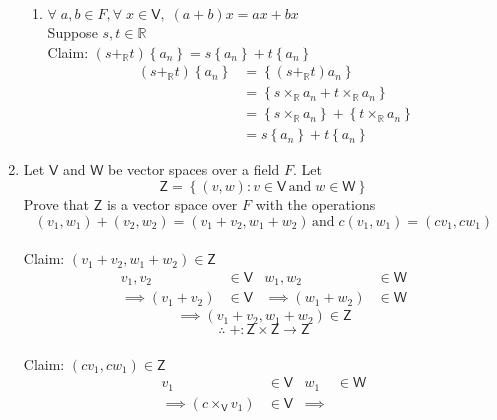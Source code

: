 \documentclass[letterpaper,12pt]{article}
\newcommand{\?}{\stackrel{?}{=}}
\begin{document}
\begin{spacing}{1.5}
\begin{enumerate}
\begin{enumerate}[(VS 1)]
\item$\forall\; a,b \in F, \forall\; x \in \mathsf{V}, \;
  \left(a+b\right)x = ax + bx$
\\
Suppose $s,t \in \mathbb{R}$ 
\\
Claim: $\left(s +_\mathbb{R} t\right)\left\{a_n\right\} =
s\left\{a_n\right\} + t\left\{a_n\right\}$
\begin{align}
\left(s+_\mathbb{R}t\right)\left\{a_n\right\} &= 
\left\{\left(s+_\mathbb{R}t\right)a_n\right\}\\
&= \left\{s\times_\mathbb{R}a_n+t\times_\mathbb{R}a_n\right\}\\
&= \left\{s\times_\mathbb{R}a_n\right\} +
\left\{t\times_\mathbb{R}a_n\right\}\\
&= s\left\{a_n\right\} + t\left\{a_n\right\}
\end{align}
\end{enumerate}
\newpage{}
\item Let $\mathsf{V}$ and $\mathsf{W}$ be vector spaces over a field
  $F$. Let 
\[
\mathsf{Z} = \left\{\left(v,w\right)\colon v \in \mathsf{V} \,\mathrm{and}\; w
  \in \mathsf{W}\right\}
\]
Prove that $\mathsf{Z}$ is a vector space over $F$ with the operations 
\[
\left(v_1, w_1\right) + \left(v_2, w_2\right) = \left(v_1 + v_2, w_1 +
  w_2\right) \, \mathrm{and}\; c\left(v_1, w_1\right) = \left(cv_1, cw_1\right)
\]
\\
Claim: $\left(v_1 + v_2, w_1 + w_2\right) \in \mathsf{Z}$
\begin{align}
v_1,v_2 &\in \mathsf{V} & w_1, w_2 &\in \mathsf{W}\\
\implies \left(v_1 + v_2\right) &\in \mathsf{V} & \implies
\left(w_1+w_2\right) &\in \mathsf{W}
\end{align}
\begin{equation}
\implies \left(v_1 + v_2, w_1 + w_2\right) \in \mathsf{Z}
\end{equation}
\begin{equation}
\therefore\; + \colon \mathsf{Z} \times \mathsf{Z} \to \mathsf{Z}
\end{equation}
\\
Claim: $\left(cv_1, cw_1\right) \in \mathsf{Z}$
\begin{align}
v_1 &\in \mathsf{V} & w_1 &\in \mathsf{W}\\
\implies \left(c \times_\mathsf{V} v_1\right) &\in \mathsf{V} & \implies

\end{align}
\end{enumerate}
\end{spacing}
\end{document}
